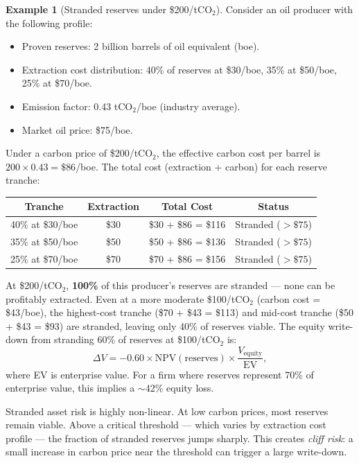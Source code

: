 \documentclass[11pt, a4paper]{article}
\theoremstyle{definition}
\newtheorem{example}{Example}[section]
\theoremstyle{plain}
\theoremstyle{remark}
\begin{document}
\begin{example}[Stranded reserves under \$200/tCO$_2$]\label{ex:stranded}
Consider an oil producer with the following profile:
\begin{itemize}
    \item Proven reserves: 2 billion barrels of oil equivalent (boe).
    \item Extraction cost distribution: 40\% of reserves at \$30/boe,
          35\% at \$50/boe, 25\% at \$70/boe.
    \item Emission factor: 0.43 tCO$_2$/boe (industry average).
    \item Market oil price: \$75/boe.
\end{itemize}

Under a carbon price of \$200/tCO$_2$, the effective carbon cost per barrel is
$200 \times 0.43 = \$86$/boe.
The total cost (extraction + carbon) for each reserve tranche:
\begin{center}
\begin{tabular}{@{}cccc@{}}
\toprule
\textbf{Tranche} & \textbf{Extraction} & \textbf{Total Cost} &
\textbf{Status} \\
\midrule
40\% at \$30/boe & \$30 & \$30 + \$86 = \$116 & Stranded ($>\$75$) \\
35\% at \$50/boe & \$50 & \$50 + \$86 = \$136 & Stranded ($>\$75$) \\
25\% at \$70/boe & \$70 & \$70 + \$86 = \$156 & Stranded ($>\$75$) \\
\bottomrule
\end{tabular}
\end{center}

At \$200/tCO$_2$, \textbf{100\%} of this producer's reserves are stranded ---
none can be profitably extracted.
Even at a more moderate \$100/tCO$_2$ (carbon cost = \$43/boe), the highest-cost
tranche (\$70 + \$43 = \$113) and mid-cost tranche (\$50 + \$43 = \$93) are
stranded, leaving only 40\% of reserves viable.
The equity write-down from stranding 60\% of reserves at \$100/tCO$_2$ is:
\begin{equation}
    \Delta V = -0.60 \times \text{NPV}(\text{reserves}) \times
    \frac{V_{\text{equity}}}{\text{EV}},
\end{equation}
where EV is enterprise value.
For a firm where reserves represent 70\% of enterprise value, this implies a
$\sim$42\% equity loss.
\end{example}

\begin{warningbox}
Stranded asset risk is highly non-linear.
At low carbon prices, most reserves remain viable.
Above a critical threshold --- which varies by extraction cost profile --- the
fraction of stranded reserves jumps sharply.
This creates \emph{cliff risk}: a small increase in carbon price near the
threshold can trigger a large write-down.
\end{warningbox}
\end{document}
